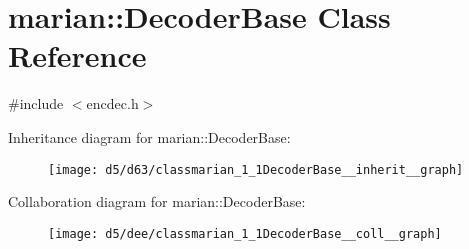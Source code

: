 \hypertarget{classmarian_1_1DecoderBase}{}\section{marian\+:\+:Decoder\+Base Class Reference}
\label{classmarian_1_1DecoderBase}


{\ttfamily \#include $<$encdec.\+h$>$}



Inheritance diagram for marian\+:\+:Decoder\+Base\+:
\nopagebreak
\begin{figure}[H]
\begin{center}
\leavevmode
\texttt{[image: d5/d63/classmarian\_1\_1DecoderBase\_\_inherit\_\_graph]}
\end{center}
\end{figure}


Collaboration diagram for marian\+:\+:Decoder\+Base\+:
\nopagebreak
\begin{figure}[H]
\begin{center}
\leavevmode
\texttt{[image: d5/dee/classmarian\_1\_1DecoderBase\_\_coll\_\_graph]}
\end{center}
\end{figure}
